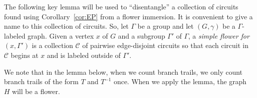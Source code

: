 \documentclass[11pt]{article}
\theoremstyle{definition}
\newcommand{\C}{\mathcal{C}}
\begin{document}
The following key lemma will be used to ``disentangle'' a collection of circuits found using Corollary~\ref{cor:EP} from a flower immersion. It is convenient to give a name to this collection of circuits. So, let $\Gamma$ be a group  and let $(G, \gamma)$ be a $\Gamma$-labeled graph. Given a vertex $x$ of $G$ and a subgroup $\Gamma'$ of $\Gamma$, a \emph{simple flower for $(x, \Gamma')$} is a collection $\C$ of pairwise edge-disjoint circuits so that each circuit in $\C$ begins at $x$ and is labeled outside of $\Gamma'$. 


We note that in the lemma below, when we count branch trails, we only count branch trails of the form $T$ and $T^{-1}$ once. When we apply the lemma, the graph $H$ will be a flower.

\end{document}
